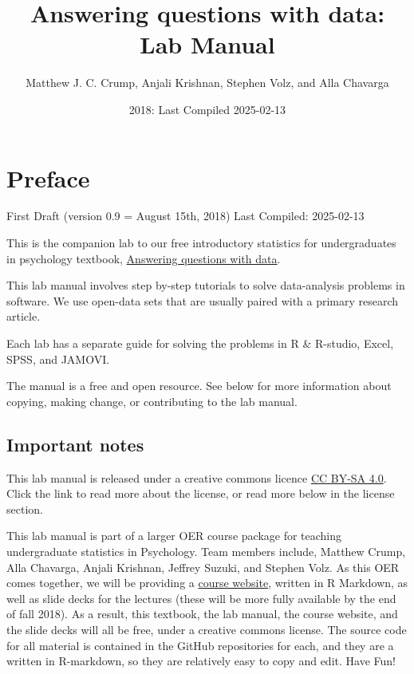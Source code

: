 \documentclass[
]{book}
\title{Answering questions with data: Lab Manual}
\author{Matthew J. C. Crump, Anjali Krishnan, Stephen Volz, and Alla Chavarga}
\date{2018: Last Compiled 2025-02-13}
\begin{document}
\maketitle

{
\setcounter{tocdepth}{1}
\tableofcontents
}
\hypertarget{preface}{%
\chapter*{Preface}\label{preface}}

First Draft (version 0.9 = August 15th, 2018)
Last Compiled: 2025-02-13

This is the companion lab to our free introductory statistics for undergraduates in psychology textbook, \href{https://crumplab.github.io/statistics/}{Answering questions with data}.

This lab manual involves step by-step tutorials to solve data-analysis problems in software. We use open-data sets that are usually paired with a primary research article.

Each lab has a separate guide for solving the problems in R \& R-studio, Excel, SPSS, and JAMOVI.

The manual is a free and open resource. See below for more information about copying, making change, or contributing to the lab manual.

\hypertarget{important-notes}{%
\section{Important notes}\label{important-notes}}

This lab manual is released under a creative commons licence \href{https://creativecommons.org/licenses/by-sa/4.0/}{CC BY-SA 4.0}. Click the link to read more about the license, or read more below in the license section.

This lab manual is part of a larger OER course package for teaching undergraduate statistics in Psychology. Team members include, Matthew Crump, Alla Chavarga, Anjali Krishnan, Jeffrey Suzuki, and Stephen Volz. As this OER comes together, we will be providing a \href{https://crumplab.github.io/psyc3400/}{course website}, written in R Markdown, as well as slide decks for the lectures (these will be more fully available by the end of fall 2018). As a result, this textbook, the lab manual, the course website, and the slide decks will all be free, under a creative commons license. The source code for all material is contained in the GitHub repositories for each, and they are a written in R-markdown, so they are relatively easy to copy and edit. Have Fun!
\end{document}
